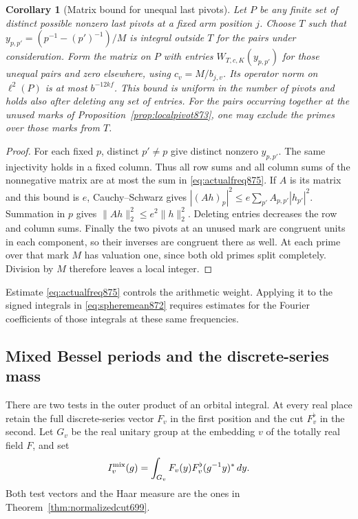 \documentclass[a4paper,11pt]{article}
\newtheorem{corollary}[proposition]{Corollary}
\theoremstyle{definition}
\theoremstyle{remark}
\numberwithin{equation}{section}
\begin{document}
\begin{corollary}[Matrix bound for unequal last pivots]\leavevmode
\label{cor:pivotoperator875}
Let \(P\) be any finite set of distinct possible nonzero last
pivots at a fixed arm position \(j\). Choose \(T\) such that
\(y_{p,p'}=(p^{-1}-(p')^{-1})/M\) is integral outside \(T\) for
the pairs under consideration. Form the matrix on \(P\) with
entries \(W_{T,c,K}(y_{p,p'})\) for those unequal pairs and
zero elsewhere, using \(c_v=M/b_{j,v}\). Its operator norm on
\(\ell^2(P)\) is at most \(b^{-12kf}\). This bound is uniform in
the number of pivots and holds also after deleting any set of entries.
For the pairs occurring together at the unused marks of
Proposition~\ref{prop:localpivot873}, one may exclude the primes
over those marks from \(T\).
\end{corollary}
\begin{proof}
For each fixed \(p\), distinct \(p'\ne p\) give distinct nonzero
\(y_{p,p'}\). The same injectivity holds in a fixed column.
Thus all row sums and all column sums of the nonnegative matrix are
at most the sum in \eqref{eq:actualfreq875}. If \(A\) is its matrix
and this bound is \(e\), Cauchy--Schwarz gives
\(|(Ah)_p|^2\le e\sum_{p'} A_{p,p'}|h_{p'}|^2\).
Summation in \(p\) gives \(\|Ah\|_2^2\le e^2\|h\|_2^2\).
Deleting entries decreases the row and column sums. Finally the two
pivots at an unused mark are congruent units in each component,
so their inverses are congruent there as well. At each prime over
that mark \(M\) has valuation one, since both old primes split
completely. Division by \(M\) therefore leaves a local integer.
\end{proof}

Estimate \eqref{eq:actualfreq875} controls the arithmetic weight.
Applying it to the signed integrals in \eqref{eq:spheremean872}
requires estimates for the Fourier coefficients of those integrals
at these same frequencies.
\clearpage

\subsection{Mixed Bessel periods and the discrete-series mass}
\label{sec:mixedperiod876}

There are two tests in the outer product of an orbital integral.
At every real place retain the full discrete-series vector \(F_v\) in the
first position and the cut \(F_v^\flat\) in the second. Let \(G_v\) be the real unitary group
at the embedding \(v\) of the totally real field \(F\), and set
\[
 I_v^{\rm mix}(g)=
       \int_{G_v} F_v(y)F_v^\flat(g^{-1}y)^*\,dy .
\]
Both test vectors and the Haar measure are the ones in
Theorem~\ref{thm:normalizedcut699}.
\end{document}
